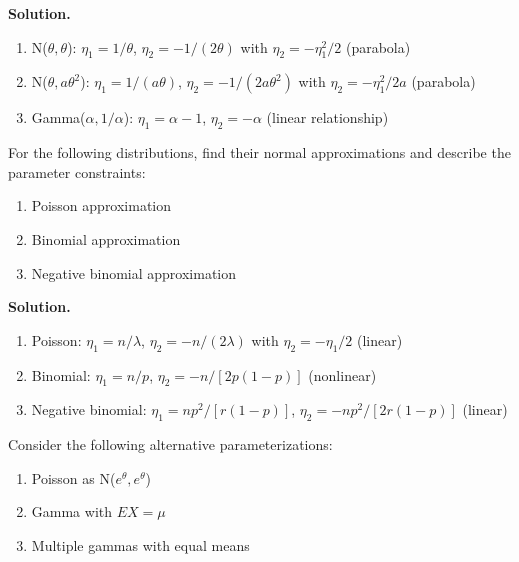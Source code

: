 \noindent\textbf{Solution.}
\begin{enumerate}[label=(\alph*)]
\item N($\theta,\theta$): $\eta_1 = 1/\theta$, $\eta_2 = -1/(2\theta)$ with $\eta_2 = -\eta_1^2/2$ (parabola)

\item N($\theta,a\theta^2$): $\eta_1 = 1/(a\theta)$, $\eta_2 = -1/(2a\theta^2)$ with $\eta_2 = -\eta_1^2/2a$ (parabola)

\item Gamma($\alpha,1/\alpha$): $\eta_1 = \alpha-1$, $\eta_2 = -\alpha$ (linear relationship)
\end{enumerate}

\begin{problembox}
For the following distributions, find their normal approximations and describe the parameter constraints:
\begin{enumerate}[label=(\alph*)]
\item Poisson approximation
\item Binomial approximation
\item Negative binomial approximation
\end{enumerate}
\end{problembox}

\noindent\textbf{Solution.}
\begin{enumerate}[label=(\alph*)]
\item Poisson: $\eta_1 = n/\lambda$, $\eta_2 = -n/(2\lambda)$ with $\eta_2 = -\eta_1/2$ (linear)

\item Binomial: $\eta_1 = n/p$, $\eta_2 = -n/[2p(1-p)]$ (nonlinear)

\item Negative binomial: $\eta_1 = np^2/[r(1-p)]$, $\eta_2 = -np^2/[2r(1-p)]$ (linear)
\end{enumerate}

\begin{problembox}
Consider the following alternative parameterizations:
\begin{enumerate}[label=(\alph*)]
\item Poisson as N($e^\theta,e^\theta$)
\item Gamma with $EX = \mu$
\item Multiple gammas with equal means
\end{enumerate}
\end{problembox}

